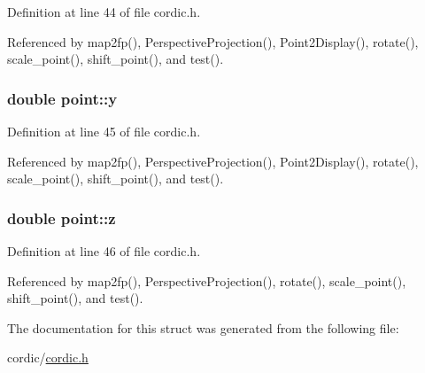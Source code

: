Definition at line 44 of file cordic.\-h.



Referenced by map2fp(), Perspective\-Projection(), Point2\-Display(), rotate(), scale\-\_\-point(), shift\-\_\-point(), and test().

\hypertarget{structpoint_a613f8f0d7352731638b0094e1b958b87}{
\subsubsection[{y}]{\setlength{\rightskip}{0pt plus 5cm}double point\-::y}}\label{structpoint_a613f8f0d7352731638b0094e1b958b87}


Definition at line 45 of file cordic.\-h.



Referenced by map2fp(), Perspective\-Projection(), Point2\-Display(), rotate(), scale\-\_\-point(), shift\-\_\-point(), and test().

\hypertarget{structpoint_aab1f0c3682401083b5bf252e7001874f}{
\subsubsection[{z}]{\setlength{\rightskip}{0pt plus 5cm}double point\-::z}}\label{structpoint_aab1f0c3682401083b5bf252e7001874f}


Definition at line 46 of file cordic.\-h.



Referenced by map2fp(), Perspective\-Projection(), rotate(), scale\-\_\-point(), shift\-\_\-point(), and test().



The documentation for this struct was generated from the following file\-:\begin{DoxyCompactItemize}
\item 
cordic/\hyperlink{cordic_8h}{cordic.\-h}\end{DoxyCompactItemize}
